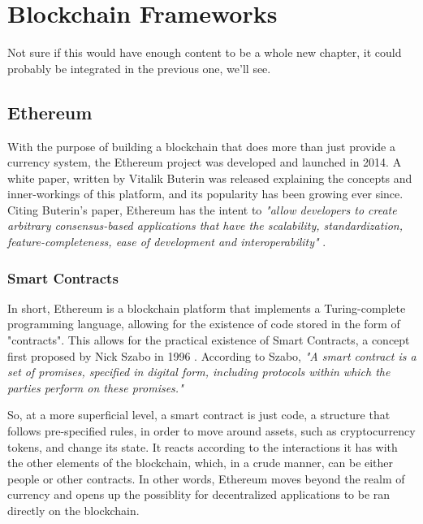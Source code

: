 \chapter{Blockchain Frameworks}
\label{chap:blockchain-frameworks}

Not sure if this would have enough content to be a whole new chapter, it could probably be integrated in the previous one, we'll see.

\section{Ethereum}

With the purpose of building a blockchain that does more than just provide a currency system, the Ethereum project was developed and launched in 2014. A white paper, written by Vitalik Buterin was released explaining the concepts and inner-workings of this platform, and its popularity has been growing ever since. Citing Buterin's paper, Ethereum has the intent to \textit{"allow developers to create arbitrary consensus-based applications that have the
scalability, standardization, feature-completeness, ease of development and interoperability" } \cite{Buterin2014}.

\subsection{Smart Contracts}
In short, Ethereum is a blockchain platform that implements a Turing-complete programming language, allowing for the existence of code stored in the form of "contracts". This allows for the practical existence of Smart Contracts, a concept first proposed by Nick Szabo in 1996 \cite{szabo1996smart}. According to Szabo, \textit{"A smart contract is a set of promises, specified in digital form, including protocols within which the parties perform on these promises."} 

So, at a more superficial level, a smart contract is just code, a structure that follows pre-specified rules, in order to move around assets, such as cryptocurrency tokens, and change its state. It reacts according to the interactions it has with the other elements of the blockchain, which, in a crude manner, can be either people or other contracts. In other words, Ethereum moves beyond the realm of currency and opens up the possiblity for decentralized applications to be ran directly on the blockchain. 


